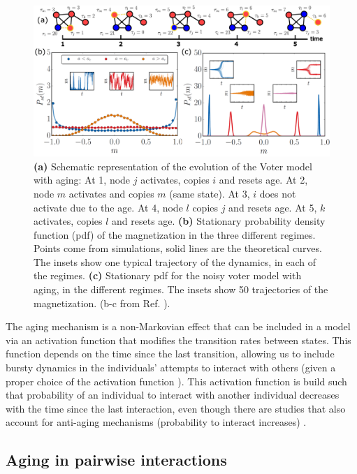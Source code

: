 \begin{figure}
    \centering
    \captionsetup{font=sf}
    \includegraphics[width=\textwidth]{Figs/Introduction/aging_plot.pdf}
    \caption[Aging in the Voter model]{\textbf{(a)} Schematic representation of the evolution of the Voter model with aging: At 1, node $j$ activates, copies $i$ and resets age. At 2, node $m$ activates and copies $m$ (same state). At 3, $i$ does not activate due to the age. At 4, node $l$ copies $j$ and resets age. At 5, $k$ activates, copies $l$ and resets age. \textbf{(b)} Stationary probability density function (pdf) of the magnetization in the three different regimes. Points come from simulations, solid lines are the theoretical curves. The insets show one typical trajectory of the dynamics, in each of the regimes. \textbf{(c)} Stationary pdf for the noisy voter model with aging, in the different regimes. The insets show 50 trajectories of the magnetization. (b-c from Ref. \cite{artime-2017}).}
    \label{fig:aging_pdf}
\end{figure}

The aging mechanism is a non-Markovian effect that can be included in a model via an activation function that modifies the transition rates between states. This function depends on the time since the last transition, allowing us to include bursty dynamics in the individuals' attempts to interact with others (given a proper choice of the activation function \cite{fernandez-gracia-2011}). This activation function is build such that probability of an individual to interact with another individual decreases with the time since the last interaction, even though there are studies that also account for anti-aging mechanisms (probability to interact increases) \cite{peralta-2020,chen-2020}.

\subsection{\label{sec:Aging in pairwise interactions} Aging in pairwise interactions}

